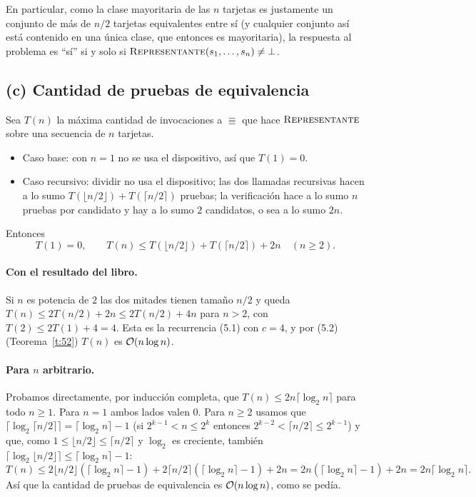 En particular, como la clase mayoritaria de las $n$ tarjetas es justamente un conjunto
de más de $n/2$ tarjetas equivalentes entre sí (y cualquier conjunto así está contenido
en una única clase, que entonces es mayoritaria), la respuesta al problema es
``sí'' si y solo si $\textsc{Representante}(s_1,\dots,s_n)\ne\bot$.

\subsection*{(c) Cantidad de pruebas de equivalencia}

Sea $T(n)$ la máxima cantidad de invocaciones a $\Equiv$ que hace
$\textsc{Representante}$ sobre una secuencia de $n$ tarjetas.
\begin{itemize}
\item Caso base: con $n=1$ no se usa el dispositivo, así que $T(1)=0$.
\item Caso recursivo: dividir no usa el dispositivo; las dos llamadas recursivas hacen a
lo sumo $T(\lfloor n/2\rfloor)+T(\lceil n/2\rceil)$ pruebas; la verificación hace a lo
sumo $n$ pruebas por candidato y hay a lo sumo $2$ candidatos, o sea a lo sumo $2n$.
\end{itemize}
Entonces
\[
T(1)=0,\qquad T(n)\le T(\lfloor n/2\rfloor)+T(\lceil n/2\rceil)+2n\quad(n\ge2).
\]

\paragraph{Con el resultado del libro.} Si $n$ es potencia de $2$ las dos mitades tienen
tamaño $n/2$ y queda $T(n)\le 2T(n/2)+2n\le 2T(n/2)+4n$ para $n>2$, con
$T(2)\le 2T(1)+4=4$. Esta es la recurrencia (5.1) con $c=4$, y por (5.2)
(Teorema~\ref{t:52}) $T(n)$ es $\mathcal{O}(n\log n)$.

\paragraph{Para $n$ arbitrario.} Probamos directamente, por inducción completa, que
$T(n)\le 2n\lceil\log_2 n\rceil$ para todo $n\ge1$. Para $n=1$ ambos lados valen $0$. Para
$n\ge2$ usamos que $\lceil\log_2\lceil n/2\rceil\rceil=\lceil\log_2 n\rceil-1$ (si
$2^{k-1}<n\le 2^k$ entonces $2^{k-2}<\lceil n/2\rceil\le 2^{k-1}$) y que, como
$1\le\lfloor n/2\rfloor\le\lceil n/2\rceil$ y $\log_2$ es creciente, también
$\lceil\log_2\lfloor n/2\rfloor\rceil\le\lceil\log_2 n\rceil-1$:
\[
T(n)\le 2\lfloor n/2\rfloor(\lceil\log_2 n\rceil-1)+2\lceil n/2\rceil(\lceil\log_2
n\rceil-1)+2n = 2n(\lceil\log_2 n\rceil-1)+2n=2n\lceil\log_2 n\rceil .
\]
Así que la cantidad de pruebas de equivalencia es $\mathcal{O}(n\log n)$, como se pedía.

